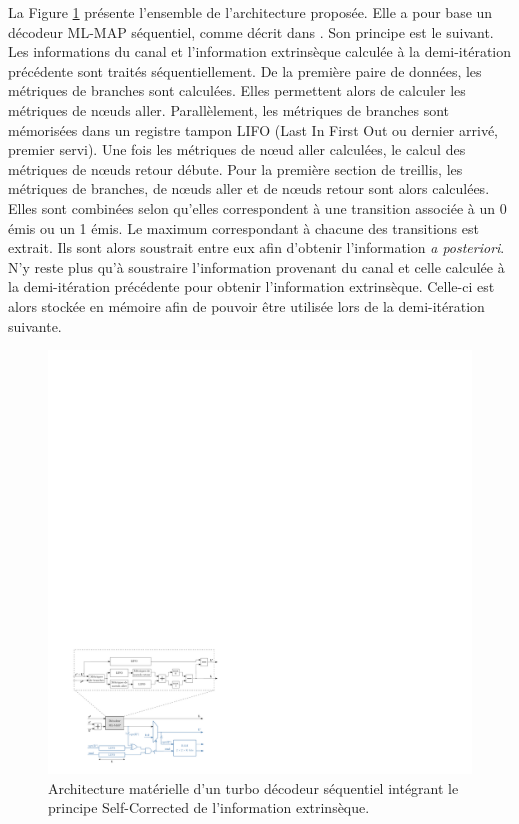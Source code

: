 La Figure \ref{fig:sc_arch} présente l'ensemble de l'architecture proposée. Elle a pour base un décodeur ML-MAP séquentiel, 
comme décrit dans \cite{livre_declercq}. Son principe est le suivant. Les 
informations du canal et l'information extrinsèque calculée à la demi-itération précédente sont traités séquentiellement. De 
la première paire de données, les métriques de branches sont calculées. Elles permettent alors de calculer les métriques 
de nœuds aller. Parallèlement, les métriques de branches sont mémorisées dans un registre tampon LIFO (Last In First Out ou 
dernier arrivé, premier servi). Une fois les métriques de nœud aller calculées, le calcul des métriques de nœuds retour débute. 
Pour la première section de treillis, les métriques de branches, de nœuds aller et de nœuds retour sont alors calculées. 
Elles sont combinées selon qu'elles correspondent à une transition associée à un 0 émis ou un 1 émis. Le maximum 
correspondant à chacune des transitions est extrait. Ils sont alors soustrait entre eux afin d'obtenir l'information \textit{a posteriori}. N'y reste plus qu'à soustraire l'information provenant du canal et celle calculée à la demi-itération 
précédente pour obtenir l'information extrinsèque. Celle-ci est alors stockée en mémoire afin 
de pouvoir être utilisée lors de la demi-itération suivante.

\begin{figure}[!t]
	\centering
	\includegraphics[width=\textwidth]{main/ch2_fig/ipe/sc_arch4.pdf}
	\vspace*{.3cm}
	\caption{\label{fig:sc_arch}Architecture matérielle d'un turbo décodeur séquentiel intégrant le principe Self-Corrected de l'information 
	extrinsèque.}
\end{figure}

